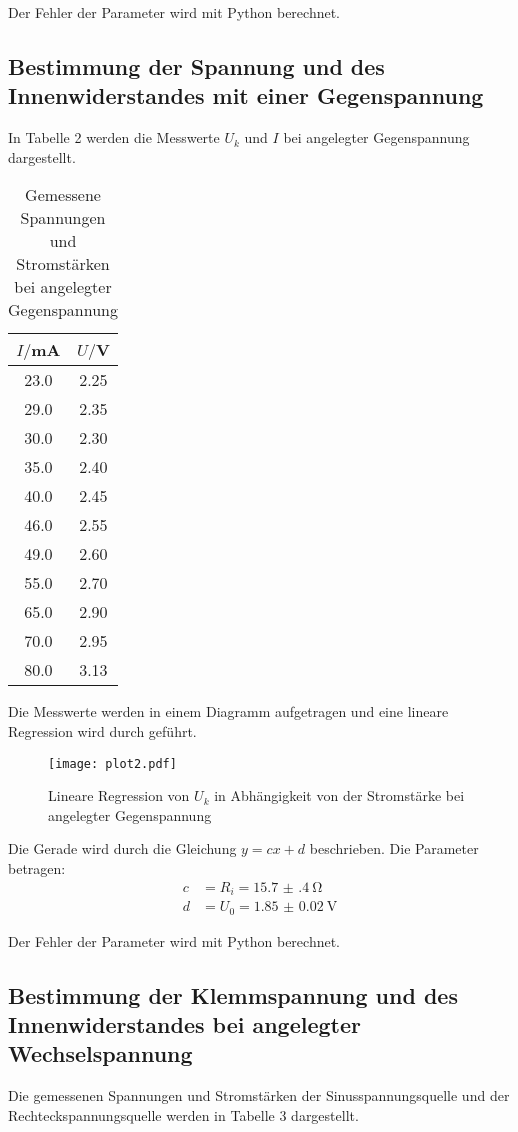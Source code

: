 Der Fehler der Parameter wird mit Python berechnet.


\subsection{Bestimmung der Spannung und des Innenwiderstandes mit einer Gegenspannung}

In Tabelle 2 werden die Messwerte $U_k$ und $I$ bei angelegter Gegenspannung dargestellt.

\begin{table}[H]
  \centering
  \caption{Gemessene Spannungen und Stromstärken bei angelegter Gegenspannung}
  \label{tab:gegenspannung}
  \begin{tabular}{c c}
    \toprule
    $I/$mA & $U/$V \\
    \midrule
    23.0  &  2.25 \\
    29.0  &  2.35 \\
    30.0  &  2.30 \\
    35.0  &  2.40 \\
    40.0  &  2.45 \\
    46.0  &  2.55 \\
    49.0  &  2.60 \\
    55.0  &  2.70 \\
    65.0  &  2.90 \\
    70.0  &  2.95 \\
    80.0  &  3.13 \\
    \bottomrule
  \end{tabular}
\end{table}

Die Messwerte werden in einem Diagramm aufgetragen und eine lineare Regression wird durch geführt.

\begin{figure}[H]
  \centering
  \texttt{[image: plot2.pdf]}
  \caption{Lineare Regression von $U_k$ in Abhängigkeit von der Stromstärke bei angelegter Gegenspannung }
  \label{fig:plot2}
\end{figure}

Die Gerade wird durch die Gleichung $y = cx + d$ beschrieben. Die Parameter betragen:
\begin{align*}
  c &= R_i = \SI{15.7(4)}{\ohm} \\
  d &= U_0 = \SI{1.85(2)}{\volt}
\end{align*}

Der Fehler der Parameter wird mit Python berechnet.


\subsection{Bestimmung der Klemmspannung und des Innenwiderstandes bei angelegter Wechselspannung}
Die gemessenen Spannungen und Stromstärken der Sinusspannungsquelle und der Rechteckspannungsquelle werden
in Tabelle 3 dargestellt.

